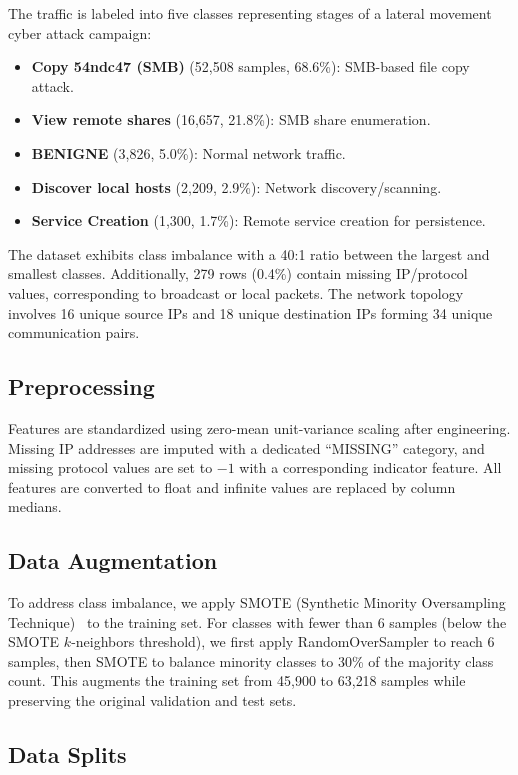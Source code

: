 \documentclass[conference]{IEEEtran}
\begin{document}
The traffic is labeled into five classes representing stages of a lateral movement cyber attack campaign:
\begin{itemize}
    \item \textbf{Copy 54ndc47 (SMB)} (52{,}508 samples, 68.6\%): SMB-based file copy attack.
    \item \textbf{View remote shares} (16{,}657, 21.8\%): SMB share enumeration.
    \item \textbf{BENIGNE} (3{,}826, 5.0\%): Normal network traffic.
    \item \textbf{Discover local hosts} (2{,}209, 2.9\%): Network discovery/scanning.
    \item \textbf{Service Creation} (1{,}300, 1.7\%): Remote service creation for persistence.
\end{itemize}

The dataset exhibits class imbalance with a 40:1 ratio between the largest and smallest classes. Additionally, 279 rows (0.4\%) contain missing IP/protocol values, corresponding to broadcast or local packets. The network topology involves 16 unique source IPs and 18 unique destination IPs forming 34 unique communication pairs.

\subsection{Preprocessing}

Features are standardized using zero-mean unit-variance scaling after engineering. Missing IP addresses are imputed with a dedicated ``MISSING'' category, and missing protocol values are set to $-1$ with a corresponding indicator feature. All features are converted to float and infinite values are replaced by column medians.

\subsection{Data Augmentation}

To address class imbalance, we apply SMOTE (Synthetic Minority Oversampling Technique)~\cite{chawla2002smote} to the training set. For classes with fewer than 6 samples (below the SMOTE $k$-neighbors threshold), we first apply RandomOverSampler to reach 6 samples, then SMOTE to balance minority classes to 30\% of the majority class count. This augments the training set from 45{,}900 to 63{,}218 samples while preserving the original validation and test sets.

\subsection{Data Splits}
\end{document}
